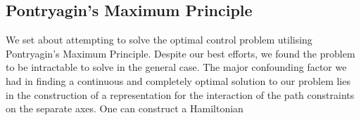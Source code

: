 \subsection{Pontryagin's Maximum Principle}

We set about attempting to solve the optimal control problem utilising Pontryagin's Maximum Principle. Despite our best efforts, we found the problem to be intractable to solve in the general case.
The major confounding factor we had in finding a continuous and completely optimal solution to our problem lies in the construction of a representation for the interaction of the path constraints on the separate axes.
One can construct a Hamiltonian
